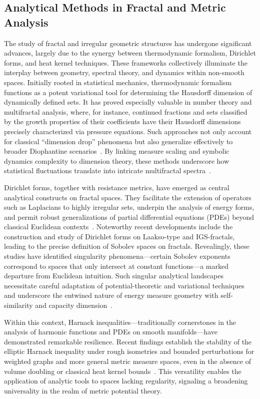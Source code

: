\subsection{Analytical Methods in Fractal and Metric Analysis}

The study of fractal and irregular geometric structures has undergone significant advances, largely due to the synergy between thermodynamic formalism, Dirichlet forms, and heat kernel techniques. These frameworks collectively illuminate the interplay between geometry, spectral theory, and dynamics within non-smooth spaces. Initially rooted in statistical mechanics, thermodynamic formalism functions as a potent variational tool for determining the Hausdorff dimension of dynamically defined sets. It has proved especially valuable in number theory and multifractal analysis, where, for instance, continued fractions and sets classified by the growth properties of their coefficients have their Hausdorff dimensions precisely characterized via pressure equations. Such approaches not only account for classical ``dimension drop'' phenomena but also generalize effectively to broader Diophantine scenarios~\cite{ref13}. By linking measure scaling and symbolic dynamics complexity to dimension theory, these methods underscore how statistical fluctuations translate into intricate multifractal spectra~\cite{ref9}.

Dirichlet forms, together with resistance metrics, have emerged as central analytical constructs on fractal spaces. They facilitate the extension of operators such as Laplacians to highly irregular sets, underpin the analysis of energy forms, and permit robust generalizations of partial differential equations (PDEs) beyond classical Euclidean contexts~\cite{ref43,ref51,ref40}. Noteworthy recent developments include the construction and study of Dirichlet forms on Laakso-type and IGS-fractals, leading to the precise definition of Sobolev spaces on fractals. Revealingly, these studies have identified singularity phenomena---certain Sobolev exponents correspond to spaces that only intersect at constant functions---a marked departure from Euclidean intuition. Such singular analytical landscapes necessitate careful adaptation of potential-theoretic and variational techniques and underscore the entwined nature of energy measure geometry with self-similarity and capacity dimension~\cite{ref43,ref40}.

Within this context, Harnack inequalities---traditionally cornerstones in the analysis of harmonic functions and PDEs on smooth manifolds---have demonstrated remarkable resilience. Recent findings establish the stability of the elliptic Harnack inequality under rough isometries and bounded perturbations for weighted graphs and more general metric measure spaces, even in the absence of volume doubling or classical heat kernel bounds~\cite{ref38}. This versatility enables the application of analytic tools to spaces lacking regularity, signaling a broadening universality in the realm of metric potential theory.

